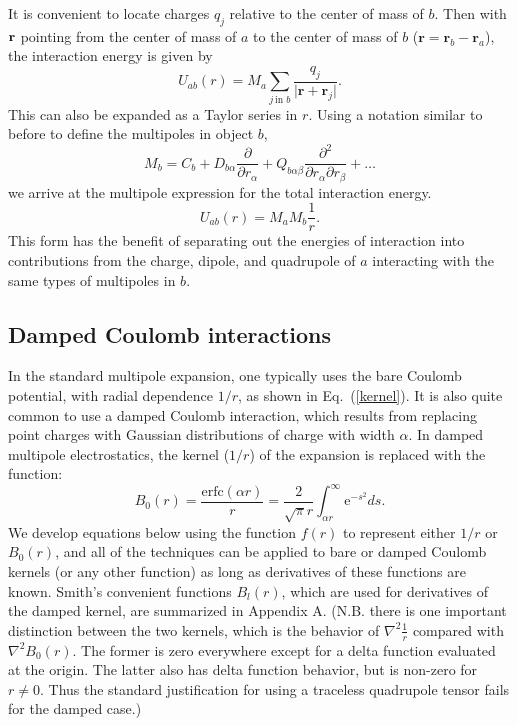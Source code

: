 It is convenient to locate charges $q_j$ relative to the center of mass of  $b$.  Then with $\bf{r}$ pointing from
the center of mass of $a$ to the center of mass of $b$ ($\mathbf{r}=\mathbf{r}_b - \mathbf{r}_a $), the interaction energy is given by
\begin{equation}
U_{ab}(r)
= M_a \sum_{j \, \text{in } b} \frac {q_j}{\vert \mathbf{r}+\mathbf{r}_j \vert} .
\end{equation}
This can also be expanded as a Taylor series in $r$.  Using a notation
similar to before to define the multipoles in object  $b$,
\begin{equation}
M_b = C_b + D_{b\alpha} \frac{\partial}{\partial r_{\alpha}} 
+   Q_{b\alpha\beta}
 \frac{\partial^2}{\partial r_{\alpha} \partial r_{\beta}} + \dots
\end{equation}
we arrive at the multipole expression for the total interaction energy.
\begin{equation}
U_{ab}(r)=M_a M_b \frac{1}{r}  \label{kernel}.
\end{equation}
This form has the benefit of separating out the energies of
interaction into contributions from the charge, dipole, and quadrupole
of $a$ interacting with the same types of multipoles in $b$.

\subsection{Damped Coulomb interactions}
\label{sec:damped}
In the standard multipole expansion, one typically uses the bare
Coulomb potential, with radial dependence $1/r$, as shown in
Eq.~(\ref{kernel}).  It is also quite common to use a damped Coulomb
interaction, which results from replacing point charges with Gaussian
distributions of charge with width $\alpha$.  In damped multipole
electrostatics, the kernel ($1/r$) of the expansion is replaced with
the function:
\begin{equation}
B_0(r)=\frac{\text{erfc}(\alpha r)}{r} = \frac{2}{\sqrt{\pi}r}
\int_{\alpha r}^{\infty} \text{e}^{-s^2} ds .
\end{equation}
We develop equations below using the function $f(r)$ to represent
either $1/r$ or $B_0(r)$, and all of the techniques can be applied to
bare or damped Coulomb kernels (or any other function) as long as
derivatives of these functions are known.  Smith's convenient
functions $B_l(r)$, which are used for derivatives of the damped
kernel, are summarized in Appendix A.  (N.B. there is one important
distinction between the two kernels, which is the behavior of
$\nabla^2 \frac{1}{r}$ compared with $\nabla^2 B_0(r)$.  The former is
zero everywhere except for a delta function evaluated at the origin.
The latter also has delta function behavior, but is non-zero for $r
\neq 0$.  Thus the standard justification for using a traceless
quadrupole tensor fails for the damped case.)

